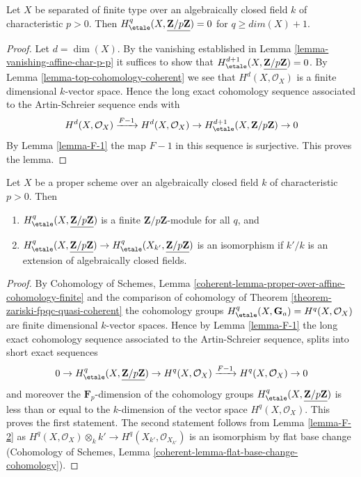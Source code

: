 \begin{lemma}
\label{lemma-vanishing-variety-char-p-p}
Let $X$ be separated of finite type over an algebraically closed
field $k$ of characteristic $p > 0$. Then
$H_\etale^q(X, \underline{\mathbf{Z}/p\mathbf{Z}}) = 0$ for
$q \geq dim(X) + 1$.
\end{lemma}

\begin{proof}
Let $d = \dim(X)$. By the vanishing established in
Lemma \ref{lemma-vanishing-affine-char-p-p}
it suffices to show that
$H_\etale^{d + 1}(X, \underline{\mathbf{Z}/p\mathbf{Z}}) = 0$.
By Lemma \ref{lemma-top-cohomology-coherent} we see that
$H^d(X, \mathcal{O}_X)$ is a finite dimensional $k$-vector space.
Hence the long exact cohomology sequence associated to the
Artin-Schreier sequence ends with
$$
H^d(X, \mathcal{O}_X) \xrightarrow{F - 1}
H^d(X, \mathcal{O}_X) \to H^{d + 1}_\etale(X, \mathbf{Z}/p\mathbf{Z}) \to 0
$$
By Lemma \ref{lemma-F-1} the map $F - 1$ in this sequence is surjective.
This proves the lemma.
\end{proof}

\begin{lemma}
\label{lemma-finiteness-proper-variety-char-p-p}
Let $X$ be a proper scheme over an algebraically closed
field $k$ of characteristic $p > 0$. Then
\begin{enumerate}
\item $H_\etale^q(X, \underline{\mathbf{Z}/p\mathbf{Z}})$
is a finite $\mathbf{Z}/p\mathbf{Z}$-module for all $q$, and
\item $H^q_\etale(X, \underline{\mathbf{Z}/p\mathbf{Z}}) \to
H^q_\etale(X_{k'}, \underline{\mathbf{Z}/p\mathbf{Z}})$
is an isomorphism if $k'/k$ is an extension of algebraically
closed fields.
\end{enumerate}
\end{lemma}

\begin{proof}
By Cohomology of Schemes, Lemma
\ref{coherent-lemma-proper-over-affine-cohomology-finite}
and the comparison of cohomology of
Theorem \ref{theorem-zariski-fpqc-quasi-coherent} the cohomology groups
$H^q_\etale(X, \mathbf{G}_a) = H^q(X, \mathcal{O}_X)$ are
finite dimensional $k$-vector spaces. Hence by
Lemma \ref{lemma-F-1} the long exact cohomology sequence
associated to the Artin-Schreier sequence, splits into
short exact sequences
$$
0 \to H_\etale^q(X, \underline{\mathbf{Z}/p\mathbf{Z}}) \to
H^q(X, \mathcal{O}_X) \xrightarrow{F - 1} H^q(X, \mathcal{O}_X) \to 0
$$
and moreover the $\mathbf{F}_p$-dimension of the cohomology groups
$H_\etale^q(X, \underline{\mathbf{Z}/p\mathbf{Z}})$ is less than or equal to the
$k$-dimension of the vector space $H^q(X, \mathcal{O}_X)$.
This proves the first statement. The second statement follows
from Lemma \ref{lemma-F-2}
as $H^q(X, \mathcal{O}_X) \otimes_k k' \to H^q(X_{k'}, \mathcal{O}_{X_{k'}})$
is an isomorphism by flat base change
(Cohomology of Schemes,
Lemma \ref{coherent-lemma-flat-base-change-cohomology}).
\end{proof}








